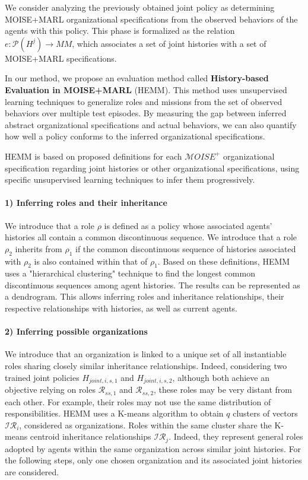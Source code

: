 \documentclass[sigconf,anonymous]{aamas}
\begin{document}
We consider analyzing the previously obtained joint policy as determining MOISE+MARL organizational specifications from the observed behaviors of the agents with this policy. This phase is formalized as the relation $e: \mathcal{P}(H^{j}) \to MM$, which associates a set of joint histories with a set of MOISE+MARL specifications.

In our method, we propose an evaluation method called \textbf{History-based Evaluation in MOISE+MARL} (HEMM). This method uses unsupervised learning techniques to generalize roles and missions from the set of observed behaviors over multiple test episodes. By measuring the gap between inferred abstract organizational specifications and actual behaviors, we can also quantify how well a policy conforms to the inferred organizational specifications.

HEMM is based on proposed definitions for each $\mathcal{M}OISE^+$ organizational specification regarding joint histories or other organizational specifications, using specific unsupervised learning techniques to infer them progressively.

\paragraph{\textbf{1) Inferring roles and their inheritance}}

We introduce that a role $\rho$ is defined as a policy whose associated agents' histories all contain a common discontinuous sequence. We introduce that a role $\rho_2$ inherits from $\rho_1$ if the common discontinuous sequence of histories associated with $\rho_2$ is also contained within that of $\rho_1$.
Based on these definitions, HEMM uses a "hierarchical clustering" technique to find the longest common discontinuous sequences among agent histories. The results can be represented as a dendrogram. This allows inferring roles and inheritance relationships, their respective relationships with histories, as well as current agents.

\paragraph{\textbf{2) Inferring possible organizations}}

We introduce that an organization is linked to a unique set of all instantiable roles sharing closely similar inheritance relationships. Indeed, considering two trained joint policies $H_{joint,i,s,1}$ and $H_{joint,i,s,2}$, although both achieve an objective relying on roles $\mathcal{R}_{ss,1}$ and $\mathcal{R}_{ss,2}$, these roles may be very distant from each other. For example, their roles may not use the same distribution of responsibilities.
HEMM uses a K-means algorithm to obtain $q$ clusters of vectors $\mathcal{IR}_{i}$, considered as organizations. Roles within the same cluster share the K-means centroid inheritance relationships $\mathcal{IR}_j$. Indeed, they represent general roles adopted by agents within the same organization across similar joint histories.
For the following steps, only one chosen organization and its associated joint histories are considered.
\end{document}
